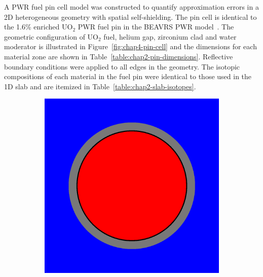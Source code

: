 A \ac{PWR} fuel pin cell model was constructed to quantify approximation errors in a 2D heterogeneous geometry with spatial self-shielding. The pin cell is identical to the 1.6\% enriched UO$_2$ \ac{PWR} fuel pin in the \ac{BEAVRS} \ac{PWR} model~\cite{horelik2013beavrs}. The geometric configuration of UO$_2$ fuel, helium gap, zirconium clad and water moderator is illustrated in Figure~\ref{fig:chap4-pin-cell} and the dimensions for each material zone are shown in Table~\ref{table:chap2-pin-dimensions}. Reflective boundary conditions were applied to all edges in the geometry. The isotopic compositions of each material in the fuel pin were identical to those used in the 1D slab and are itemized in Table~\ref{table:chap2-slab-isotopes}. 

\begin{figure}[H]
\centering
\begin{subfigure}{.32\textwidth}
  \includegraphics[width=0.9\linewidth]{figures/biases/pin-cell/pin-cell-simple}
  \caption{}
\end{subfigure}%
\begin{subfigure}{.32\textwidth}
  \centering

\end{subfigure}
\end{figure}

